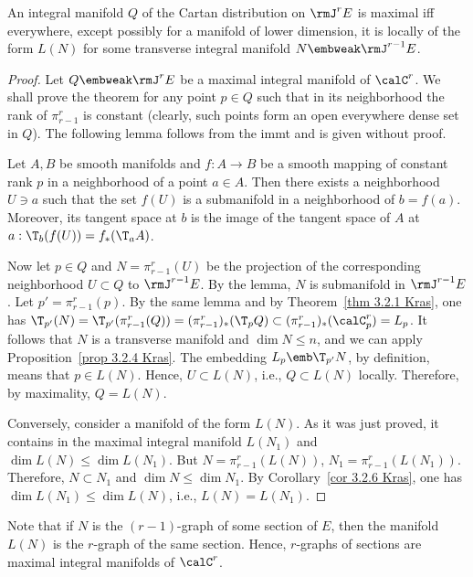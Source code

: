 \begin{thm}\label{thm 3.2.7 Kras}
    An integral manifold $Q$ of the Cartan distribution on $\rmJ^r E$ is maximal iff everywhere, except possibly for a manifold of lower dimension, it is locally of the form $L(N)$ for some transverse integral manifold $N\embweak\rmJ^{r-1}E$. 
\end{thm}
\begin{proof}
    Let $Q\embweak \rmJ^rE$ be a maximal integral manifold of $\calC^r$. We shall prove the theorem for any point $p\in Q$ such that in its neighborhood the rank of $\pi^r_{r-1}$ is constant (clearly, such points form an open everywhere dense set in $Q$). The following lemma follows from the \gls{immt} and is given without proof.

    \begin{lem}
        Let $A,B$ be smooth manifolds and $f:A\to B$ be a smooth mapping of constant rank $p$ in a neighborhood of a point $a\in A$. Then there exists a neighborhood $U\ni a$ such that the set $f(U)$ is a submanifold in a neighborhood of $b=f(a)$. Moreover, its tangent space at $b$ is the image of the tangent space of $A$ at $a:\T_b (f(U))=f_\ast(\T_a A)$.
    \end{lem}

    Now let $p\in Q$ and $N=\pi^r_{r-1}(U)$ be the projection of the corresponding neighborhood $U\subset Q$ to $\rmJ^{r-1}E$. By the lemma, $N$ is submanifold in $\rmJ^{r-1}E$. Let $p'=\pi^r_{r-1}(p)$. By the same lemma and by Theorem~\ref{thm 3.2.1 Kras}, one has $\T_{p'}(N)=\T_{p'}(\pi^r_{r-1}(Q))=(\pi^r_{r-1})_\ast (\T_p Q)\subset (\pi^r_{r-1})_\ast (\calC^r_p)=L_p$. It follows that $N$ is a transverse manifold and $\dim N\leq n$, and we can apply Proposition~\ref{prop 3.2.4 Kras}. The embedding $L_p\emb \T_{p'}N$, by definition, means that $p\in L(N)$. Hence, $U\subset L(N)$, i.e., $Q\subset L(N)$ locally. Therefore, by maximality, $Q=L(N)$.

    Conversely, consider a manifold of the form $L(N)$. As it was just proved, it contains in the maximal integral manifold $L(N_1)$ and $\dim L(N)\leq \dim L(N_1)$. But $N=\pi^r_{r-1}(L(N))$, $N_1=\pi^r_{r-1}(L(N_1))$. Therefore, $N\subset N_1$ and $\dim N\leq \dim N_1$. By Corollary~\ref{cor 3.2.6 Kras}, one has $\dim L(N_1)\leq \dim L(N)$, i.e., $L(N)=L(N_1)$.
\end{proof}

Note that if $N$ is the $(r-1)$-graph of some section of $E$, then the manifold $L(N)$ is the $r$-graph of the same section. Hence, $r$-graphs of sections are maximal integral manifolds of $\calC^r$.

